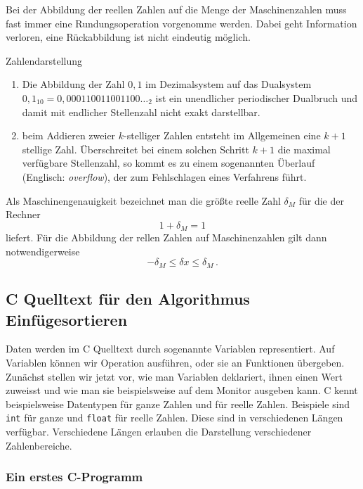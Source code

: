 Bei der Abbildung der reellen Zahlen auf die Menge der Maschinenzahlen
muss fast immer eine Rundungsoperation vorgenomme werden. Dabei geht
Information verloren, eine Rückabbildung ist nicht eindeutig möglich.

\begin{myexampleblock}{Zahlendarstellung}
  \begin{enumerate}
  \item Die Abbildung der Zahl $0,1$ im Dezimalsystem auf das
    Dualsystem $0,1_{10} = 0,000110011001100\ldots_2$ ist ein unendlicher
    periodischer Dualbruch und damit mit endlicher Stellenzahl nicht
    exakt darstellbar.
  \item beim Addieren zweier $k$-stelliger Zahlen entsteht im
    Allgemeinen eine $k+1$ stellige Zahl. Überschreitet bei einem
    solchen Schritt $k+1$ die maximal verfügbare Stellenzahl, so kommt
    es zu einem sogenannten Überlauf (Englisch: \emph{overflow}), der
    zum Fehlschlagen eines Verfahrens führt.
  \end{enumerate}
\end{myexampleblock}
Als Maschinengenauigkeit bezeichnet man die größte reelle Zahl
$\delta_M$ für die der Rechner
\begin{equation}
1 + \delta_M = 1
\end{equation}
liefert. Für die Abbildung der rellen Zahlen auf Maschinenzahlen gilt
dann notwendigerweise
\begin{equation}
-\delta_M \leq \delta x\leq \delta_M\,.
\end{equation}


\subsection{C Quelltext für den Algorithmus Einfügesortieren}

Daten werden im C Quelltext durch sogenannte Variablen representiert. 
Auf Variablen können wir Operation ausführen, oder sie an Funktionen übergeben.
Zunächst stellen wir jetzt vor, wie man Variablen deklariert, ihnen einen Wert zuweisst und wie man sie beispielsweise auf dem Monitor ausgeben kann.
C kennt beispielsweise Datentypen für ganze Zahlen und für reelle Zahlen.
Beispiele sind \texttt{int} für ganze und \texttt{float} für reelle Zahlen.
Diese sind in verschiedenen Längen verfügbar.
Verschiedene Längen erlauben die Darstellung verschiedener Zahlenbereiche.

\subsubsection{Ein erstes C-Programm}

